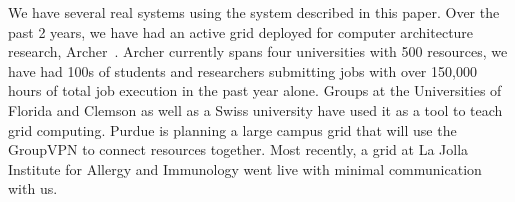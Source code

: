 \documentclass{sig-alternate}
\begin{document}
We have several real systems using the system described in this paper.  Over
the past 2 years, we have had an active grid deployed for computer architecture
research, Archer~\cite{archer}.  Archer currently spans four universities with
500 resources, we have had 100s of students and researchers submitting jobs
with over 150,000 hours of total job execution in the past year alone.  Groups
at the Universities of Florida and Clemson as well as a Swiss university have
used it as a tool to teach grid computing.  Purdue is planning a large campus
grid that will use the GroupVPN to connect resources together.  Most recently,
a grid at La Jolla Institute for Allergy and Immunology went live with minimal
communication with us.


\small{

\suppressfloats
}
\end{document}
